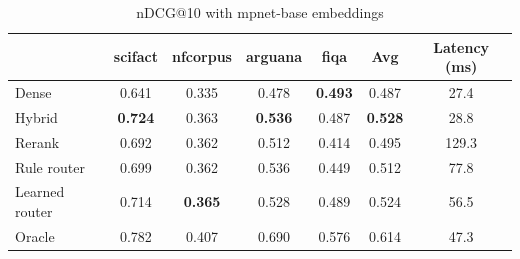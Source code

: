 \begin{table}[t]
\centering
\caption{nDCG@10 with mpnet-base embeddings}
\label{tab:ndcg_mpnet-base}
\begin{tabular}{lcccccc}
\toprule
 & scifact & nfcorpus & arguana & fiqa & Avg & Latency (ms) \\
\midrule
Dense & 0.641 & 0.335 & 0.478 & \textbf{0.493} & 0.487 & 27.4 \\
Hybrid & \textbf{0.724} & 0.363 & \textbf{0.536} & 0.487 & \textbf{0.528} & 28.8 \\
Rerank & 0.692 & 0.362 & 0.512 & 0.414 & 0.495 & 129.3 \\
\midrule
Rule router & 0.699 & 0.362 & 0.536 & 0.449 & 0.512 & 77.8 \\
Learned router & 0.714 & \textbf{0.365} & 0.528 & 0.489 & 0.524 & 56.5 \\
Oracle & 0.782 & 0.407 & 0.690 & 0.576 & 0.614 & 47.3 \\
\bottomrule
\end{tabular}
\end{table}